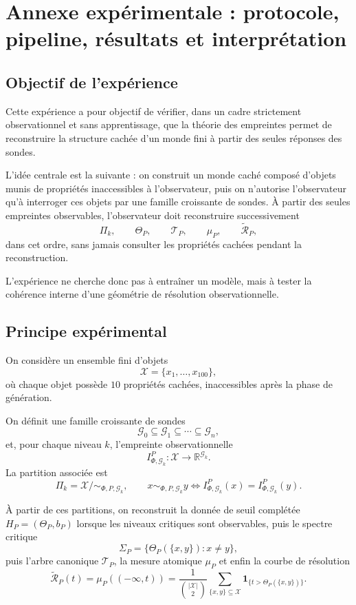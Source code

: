\documentclass[11pt,a4paper,openany]{book}
\begin{document}
\section{Annexe expérimentale : protocole, pipeline, résultats et interprétation}

\subsection{Objectif de l'expérience}

Cette expérience a pour objectif de vérifier, dans un cadre strictement observationnel et sans apprentissage, que la théorie des empreintes permet de reconstruire la structure cachée d'un monde fini à partir des seules réponses des sondes.

L'idée centrale est la suivante : on construit un monde caché composé d'objets munis de propriétés inaccessibles à l'observateur, puis on n'autorise l'observateur qu'à interroger ces objets par une famille croissante de sondes. À partir des seules empreintes observables, l'observateur doit reconstruire successivement
\[
\Pi_k,\qquad \Theta_P,\qquad \mathcal T_P,\qquad \mu_P,\qquad \widetilde{\mathcal R}_P,
\]
dans cet ordre, sans jamais consulter les propriétés cachées pendant la reconstruction.

L'expérience ne cherche donc pas à entraîner un modèle, mais à tester la cohérence interne d'une géométrie de résolution observationnelle.

\subsection{Principe expérimental}

On considère un ensemble fini d'objets
\[
\mathcal X=\{x_1,\dots,x_{100}\},
\]
où chaque objet possède \(10\) propriétés cachées, inaccessibles après la phase de génération.

On définit une famille croissante de sondes
\[
\mathcal G_0\subseteq \mathcal G_1\subseteq \cdots \subseteq \mathcal G_n,
\]
et, pour chaque niveau \(k\), l'empreinte observationnelle
\[
I_{\Phi,\mathcal G_k}^P:\mathcal X\to \mathbb R^{\mathcal G_k}.
\]
La partition associée est
\[
\Pi_k=\mathcal X/{\sim_{\Phi,P,\mathcal G_k}},
\qquad
x\sim_{\Phi,P,\mathcal G_k}y
\Longleftrightarrow
I_{\Phi,\mathcal G_k}^P(x)=I_{\Phi,\mathcal G_k}^P(y).
\]

À partir de ces partitions, on reconstruit la donnée de seuil complétée \(H_P=(\Theta_P,b_P)\) lorsque les niveaux critiques sont observables, puis le spectre critique
\[
\Sigma_P=\{\Theta_P(\{x,y\}) : x\neq y\},
\]
puis l'arbre canonique \(\mathcal T_P\), la mesure atomique \(\mu_P\) et enfin la courbe de résolution
\[
\widetilde{\mathcal R}_P(t)
=
\mu_P((-\infty,t))
=
\frac{1}{\binom{|\mathcal X|}{2}}
\sum_{\{x,y\}\subseteq\mathcal X}
\mathbf 1_{\{t>\Theta_P(\{x,y\})\}}.
\]
\end{document}
